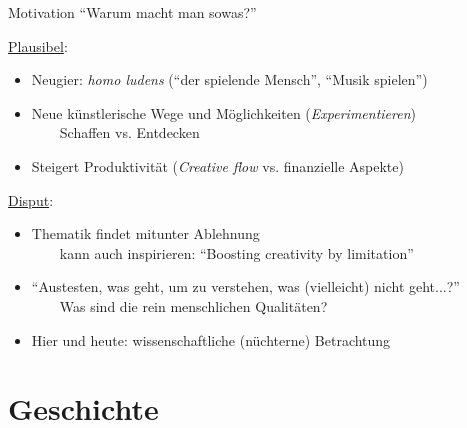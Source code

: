 \begin{frame}[t]{Motivation}
{\enquote{Warum macht man sowas?}}

	
	\underline{Plausibel}:
	\begin{itemize}
		\item Neugier: \emph{homo ludens} (\enquote{der spielende Mensch}, \enquote{Musik spielen}) %
		\item Neue künstlerische Wege und Möglichkeiten (\emph{Experimentieren})\\
		~~~\conclude~Schaffen vs. Entdecken \citep[S.591]{MDABook}
		\item Steigert Produktivität (\emph{Creative flow} vs. finanzielle Aspekte)
	\end{itemize}
	\smallskip
	
	\underline{Disput}:
	\begin{itemize}
		\item Thematik findet mitunter Ablehnung\\
		~~~\conclude~kann auch inspirieren: \enquote{Boosting creativity by limitation}
		\item \enquote{Austesten, was geht, um zu verstehen, was (vielleicht) nicht geht...?} \\
		~~~\conclude~Was sind die rein menschlichen Qualitäten?
		\medskip
		\item[\Conclude] Hier und heute: wissenschaftliche (nüchterne) Betrachtung
	\end{itemize}
	
\end{frame}

\section{Geschichte}

